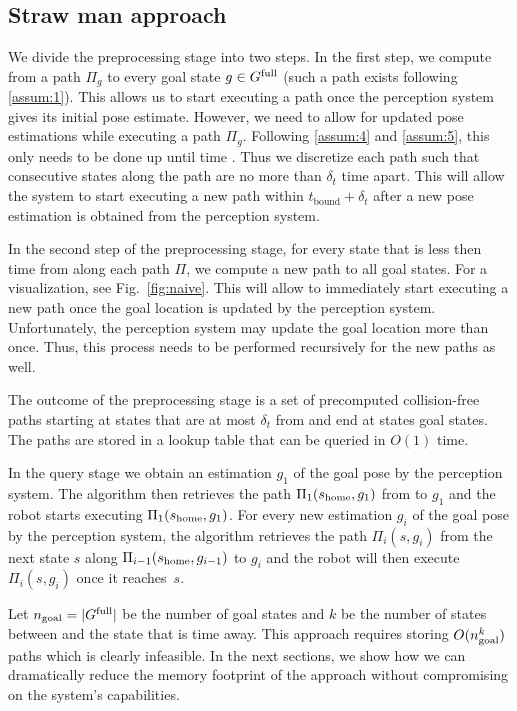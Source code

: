 \documentclass[conference]{IEEEtran}
\begin{document}
\subsection{Straw man approach}
We divide the preprocessing stage into two steps.
In the first step, we compute from \Shome a path $\Pi_g$ to every goal state $ g \in G^{\textrm{full}}$ (such a path exists following \ref{assum:1}).
This allows us to start executing a path once the perception system gives its initial pose estimate.
However, we need to allow for updated pose estimations while executing a path $\Pi_g$.
%
Following \ref{assum:4} and \ref{assum:5}, this only needs to be done up until time \Trc.
Thus we discretize each path such that consecutive states along the path are no more than $\delta _t$ time apart. This will allow the system to start executing a new path within $t_{\textrm{bound}} + \delta_t$ after a new pose estimation is obtained from the perception system.
%

In the second step of the preprocessing stage, for every state that is less then \Trc time from \Shome along each path $\Pi$, we compute a new path to all goal states.
For a visualization, see Fig.~\ref{fig:naive}.
%
This will allow to immediately start executing a new path once the goal location is updated by the perception system.
%
Unfortunately, the perception system may update the goal location more than once. Thus, this process needs to be performed recursively for the new paths as well.


%
The outcome of the preprocessing stage is a set of precomputed collision-free paths starting at states that are at most $\delta_t$ from \Shome and end at states goal states.
The paths are stored in a lookup table that can be queried in $O(1)$ time.

In the query stage we obtain an estimation $g_1$ of the goal pose by the perception system. 
The algorithm then retrieves the path $\Pi_1(s_{\textrm{home}},g_1)$ from \Shome to $g_1$ and the robot starts executing $\Pi_1(s_{\textrm{home}},g_1)$.
%
For every new estimation $g_i$ of the goal pose by the perception system, the algorithm retrieves the path $\Pi_i(s,g_i)$ from the next state $s$ along $\Pi_{i-1}(s_{\textrm{home}},g_{i-1})$ to $g_{i}$ and the robot will then execute $\Pi_i(s,g_i)$ once it reaches~$s$.


Let $n_{\rm goal} = \vert G^{\textrm{full}} \vert$ be the number of goal states and
$k$ be the number of states between \Shome and the state that is \Trc time away.
This approach requires storing $O(n_{\rm goal}^k)$ paths which is clearly infeasible.
In the next sections, we show how we can dramatically reduce the memory footprint of the approach without compromising on the system's capabilities.
\end{document}
